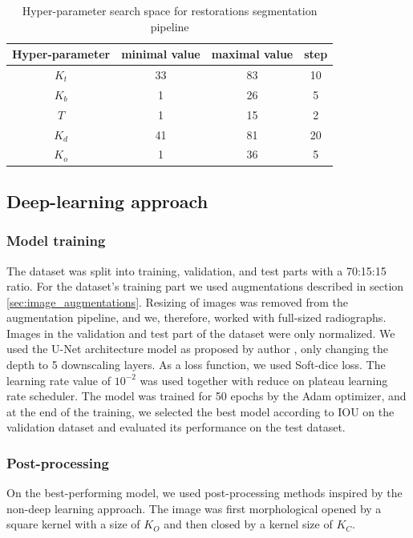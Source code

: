 \begin{table}
    \begin{tabular}{|c|c|c|c|}
        \hline
        Hyper-parameter & minimal value & maximal value & step \\ \hline
        $K_t$           & 33            & 83            & 10   \\ \hline
        $K_b$           & 1             & 26            & 5    \\ \hline
        $T$             & 1             & 15            & 2    \\ \hline
        $K_d$           & 41            & 81            & 20   \\ \hline
        $K_o$           & 1             & 36            & 5    \\ \hline
    \end{tabular}
    \caption{Hyper-parameter search space for restorations segmentation pipeline}
    \label{tab:hyper_param_segmentation}
\end{table}

\subsection{Deep-learning approach}
\subsubsection{Model training}
The dataset was split into training, validation, and test parts with a 70:15:15 ratio. For the dataset's training part we used augmentations described in section \ref{sec:image_augmentations}. Resizing of images was removed from the augmentation pipeline, and we, therefore, worked with full-sized radiographs. Images in the validation and test part of the dataset were only normalized.
We used the U-Net architecture model as proposed by author \cite{Ronneberger2015}, only changing the depth to 5 downscaling layers. As a loss function, we used Soft-dice loss. The learning rate value of $10^{-2}$ was used together with reduce on plateau learning rate scheduler. The model was trained for 50 epochs by the Adam optimizer, and at the end of the training, we selected the best model according to IOU on the validation dataset and evaluated its performance on the test dataset.

\subsubsection{Post-processing}
\label{sec:segmentation_post_processing}
On the best-performing model, we used post-processing methods inspired by the non-deep learning approach. The image was first morphological opened by a square kernel with a size of $K_O$ and then closed by a kernel size of $K_C$.

